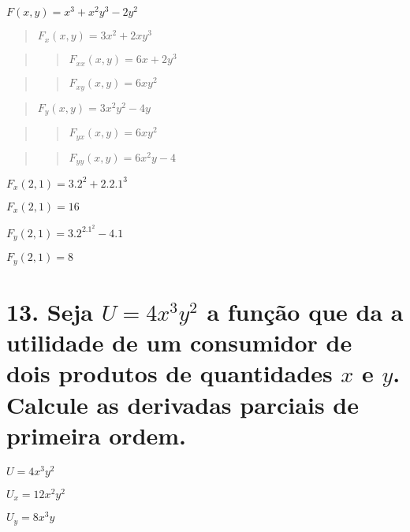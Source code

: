 \(F(x,y)=x^3+x^2y^3-2y^2\)

\begin{quote}
\(F_x(x,y)=3x^2+2xy^3\)
\end{quote}

\begin{quote}
\begin{quote}
\(F_{xx}(x,y)=6x+2y^3\)
\end{quote}
\end{quote}

\begin{quote}
\begin{quote}
\(F_{xy}(x,y)=6xy^2\)
\end{quote}
\end{quote}

\begin{quote}
\(F_y(x,y)=3x^2y^2-4y\)
\end{quote}

\begin{quote}
\begin{quote}
\(F_{yx}(x,y)=6xy^2\)
\end{quote}
\end{quote}

\begin{quote}
\begin{quote}
\(F_{yy}(x,y)=6x^2y-4\)
\end{quote}
\end{quote}

\(F_x(2,1)=3.2^2+2.2.1^3\)

\(F_x(2,1)=16\)

\(F_y(2,1)=3.2^2.1^2-4.1\)

\(F_y(2,1)=8\)

\hypertarget{seja-u4x3y2-a-funuxe7uxe3o-que-da-a-utilidade-de-um-consumidor-de-dois-produtos-de-quantidades-x-e-y.-calcule-as-derivadas-parciais-de-primeira-ordem.}{%
\section{\texorpdfstring{13. Seja \(U=4x^3y^2\) a função que da a
utilidade de um consumidor de dois produtos de quantidades \(x\) e
\(y\). Calcule as derivadas parciais de primeira
ordem.}{13. Seja U=4x\^{}3y\^{}2 a função que da a utilidade de um consumidor de dois produtos de quantidades x e y. Calcule as derivadas parciais de primeira ordem.}}\label{seja-u4x3y2-a-funuxe7uxe3o-que-da-a-utilidade-de-um-consumidor-de-dois-produtos-de-quantidades-x-e-y.-calcule-as-derivadas-parciais-de-primeira-ordem.}}

\(U=4x^3y^2\)

\(U_x=12x^2y^2\)

\(U_y=8x^3y\)
